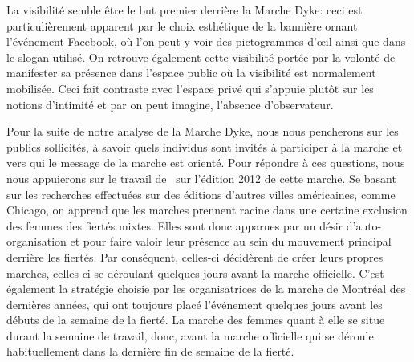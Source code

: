 La visibilité semble être le but premier derrière la Marche Dyke: ceci est particulièrement apparent par le choix esthétique de la bannière ornant l'événement Facebook, où l'on peut y voir des pictogrammes d'œil ainsi que dans le slogan utilisé.
On retrouve également cette visibilité portée par la volonté de manifester sa présence dans l'espace public où la visibilité est normalement mobilisée.
Ceci fait contraste avec l'espace privé qui s'appuie plutôt sur les notions d'intimité et par on peut imagine, l'absence d'observateur.

Pour la suite de notre analyse de la Marche Dyke, nous nous pencherons sur les publics sollicités, à savoir quels individus sont invités à participer à la marche et vers qui le message de la marche est orienté.
Pour répondre à ces questions, nous nous appuierons sur le travail de~\cite{Podmore2015a} sur l'édition 2012 de cette marche.
Se basant sur les recherches effectuées sur des éditions d'autres villes américaines, comme Chicago, on apprend que les marches \dykes{} prennent racine dans une certaine exclusion des femmes des fiertés mixtes.
Elles sont donc apparues par un désir d'auto-organisation et pour faire valoir leur présence au sein du mouvement principal derrière les fiertés.
Par conséquent, celles-ci décidèrent de créer leurs propres marches, celles-ci se déroulant quelques jours avant la marche officielle.
C'est également la stratégie choisie par les organisatrices de la marche de Montréal des dernières années, qui ont toujours placé l'événement quelques jours avant les débuts de la semaine de la fierté.
La marche des femmes quant à elle se situe durant la semaine de travail, donc, avant la marche officielle qui se déroule habituellement dans la dernière fin de semaine de la fierté.

